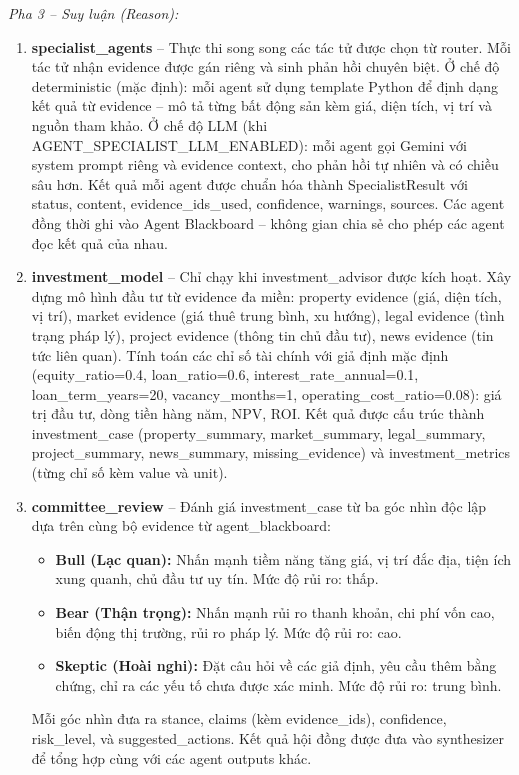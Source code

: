 \textit{Pha 3 -- Suy luận (Reason):}

\begin{enumerate}[leftmargin=4em]
    \item[7.] \textbf{specialist\_agents} -- Thực thi song song các tác tử được chọn từ router. Mỗi tác tử nhận evidence được gán riêng và sinh phản hồi chuyên biệt. Ở chế độ deterministic (mặc định): mỗi agent sử dụng template Python để định dạng kết quả từ evidence -- mô tả từng bất động sản kèm giá, diện tích, vị trí và nguồn tham khảo. Ở chế độ LLM (khi AGENT\_SPECIALIST\_LLM\_ENABLED): mỗi agent gọi Gemini với system prompt riêng và evidence context, cho phản hồi tự nhiên và có chiều sâu hơn. Kết quả mỗi agent được chuẩn hóa thành SpecialistResult với status, content, evidence\_ids\_used, confidence, warnings, sources. Các agent đồng thời ghi vào Agent Blackboard -- không gian chia sẻ cho phép các agent đọc kết quả của nhau.

    \item[8.] \textbf{investment\_model} -- Chỉ chạy khi investment\_advisor được kích hoạt. Xây dựng mô hình đầu tư từ evidence đa miền: property evidence (giá, diện tích, vị trí), market evidence (giá thuê trung bình, xu hướng), legal evidence (tình trạng pháp lý), project evidence (thông tin chủ đầu tư), news evidence (tin tức liên quan). Tính toán các chỉ số tài chính với giả định mặc định (equity\_ratio=0.4, loan\_ratio=0.6, interest\_rate\_annual=0.1, loan\_term\_years=20, vacancy\_months=1, operating\_cost\_ratio=0.08): giá trị đầu tư, dòng tiền hàng năm, NPV, ROI. Kết quả được cấu trúc thành investment\_case (property\_summary, market\_summary, legal\_summary, project\_summary, news\_summary, missing\_evidence) và investment\_metrics (từng chỉ số kèm value và unit).

    \item[9.] \textbf{committee\_review} -- Đánh giá investment\_case từ ba góc nhìn độc lập dựa trên cùng bộ evidence từ agent\_blackboard:
    \begin{itemize}
        \item \textbf{Bull (Lạc quan):} Nhấn mạnh tiềm năng tăng giá, vị trí đắc địa, tiện ích xung quanh, chủ đầu tư uy tín. Mức độ rủi ro: thấp.
        \item \textbf{Bear (Thận trọng):} Nhấn mạnh rủi ro thanh khoản, chi phí vốn cao, biến động thị trường, rủi ro pháp lý. Mức độ rủi ro: cao.
        \item \textbf{Skeptic (Hoài nghi):} Đặt câu hỏi về các giả định, yêu cầu thêm bằng chứng, chỉ ra các yếu tố chưa được xác minh. Mức độ rủi ro: trung bình.
    \end{itemize}
    Mỗi góc nhìn đưa ra stance, claims (kèm evidence\_ids), confidence, risk\_level, và suggested\_actions. Kết quả hội đồng được đưa vào synthesizer để tổng hợp cùng với các agent outputs khác.
\end{enumerate}

